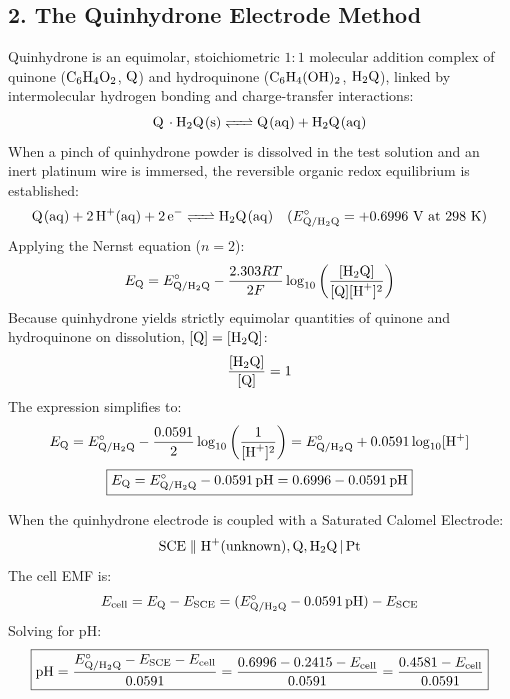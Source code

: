 \subsection{2. The Quinhydrone Electrode Method}
Quinhydrone is an equimolar, stoichiometric $1:1$ molecular addition complex of quinone ($\ce{C6H4O2}$, $\ce{Q}$) and hydroquinone ($\ce{C6H4(OH)2}$, $\ce{H2Q}$), linked by intermolecular hydrogen bonding and charge-transfer interactions:
\begin{equation}
    \ce{Q \cdot H2Q(s) <=> Q(aq) + H2Q(aq)}
\end{equation}
When a pinch of quinhydrone powder is dissolved in the test solution and an inert platinum wire is immersed, the reversible organic redox equilibrium is established:
\begin{equation}
    \ce{Q(aq) + 2H+(aq) + 2e^- <=> H2Q(aq)} \quad (E^\circ_{\ce{Q/H2Q}} = +0.6996\text{ V at } 298\text{ K})
\end{equation}
Applying the Nernst equation ($n = 2$):
\begin{equation}
    E_{\ce{Q}} = E^\circ_{\ce{Q/H2Q}} - \frac{2.303 RT}{2F} \log_{10} \left( \frac{[\ce{H2Q}]}{[\ce{Q}][\ce{H+}]^2} \right)
\end{equation}
Because quinhydrone yields strictly equimolar quantities of quinone and hydroquinone on dissolution, $[\ce{Q}] = [\ce{H2Q}]$:
\begin{equation}
    \frac{[\ce{H2Q}]}{[\ce{Q}]} = 1
\end{equation}
The expression simplifies to:
\begin{equation}
    E_{\ce{Q}} = E^\circ_{\ce{Q/H2Q}} - \frac{0.0591}{2} \log_{10} \left( \frac{1}{[\ce{H+}]^2} \right) = E^\circ_{\ce{Q/H2Q}} + 0.0591 \log_{10} [\ce{H+}]
\end{equation}
\begin{equation}
    \boxed{E_{\ce{Q}} = E^\circ_{\ce{Q/H2Q}} - 0.0591\,\text{pH} = 0.6996 - 0.0591\,\text{pH}}
\end{equation}

When the quinhydrone electrode is coupled with a Saturated Calomel Electrode:
\begin{equation}
    \text{SCE} \parallel \ce{H+(unknown), Q, H2Q | Pt}
\end{equation}
The cell EMF is:
\begin{equation}
    E_{\text{cell}} = E_{\ce{Q}} - E_{\text{SCE}} = (E^\circ_{\ce{Q/H2Q}} - 0.0591\,\text{pH}) - E_{\text{SCE}}
\end{equation}
Solving for $\text{pH}$:
\begin{equation}
    \boxed{\text{pH} = \frac{E^\circ_{\ce{Q/H2Q}} - E_{\text{SCE}} - E_{\text{cell}}}{0.0591} = \frac{0.6996 - 0.2415 - E_{\text{cell}}}{0.0591} = \frac{0.4581 - E_{\text{cell}}}{0.0591}}
\end{equation}


